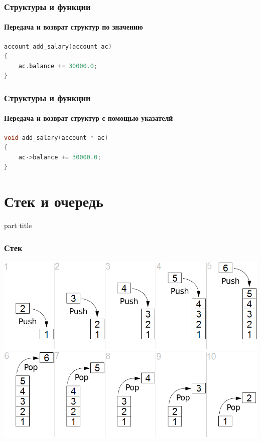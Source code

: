\documentclass[14pt,pdf,hyperref={unicode}]{beamer}
\begin{document}
\begin{frame}[fragile]
\frametitle{Структуры и функции} 
\framesubtitle{Передача и возврат структур по значению} 

\begin{lstlisting}[language=C++,basicstyle=\ttfamily,keywordstyle=\color{blue}]
account add_salary(account ac)
{
    ac.balance += 30000.0;
}
\end{lstlisting}
\end{frame}

\begin{frame}[fragile]
\frametitle{Структуры и функции} 
\framesubtitle{Передача и возврат структур с помощью указателй} 

\begin{lstlisting}[language=C++,basicstyle=\ttfamily,keywordstyle=\color{blue}]
void add_salary(account * ac)
{
    ac->balance += 30000.0;
}
\end{lstlisting}
\end{frame}




\section{Стек и очередь}
\begin{frame}
\begin{center}
\begin{beamercolorbox}[sep=8pt,center]{part
title}
\insertsection
\end{beamercolorbox}
\end{center}
\end{frame}



\begin{frame}[fragile]
\frametitle{Стек} 
\begin{center}
\includegraphics[width=0.8\linewidth]{images/Lifo_stack.png}
\end{center}
\end{frame}
\end{document}
